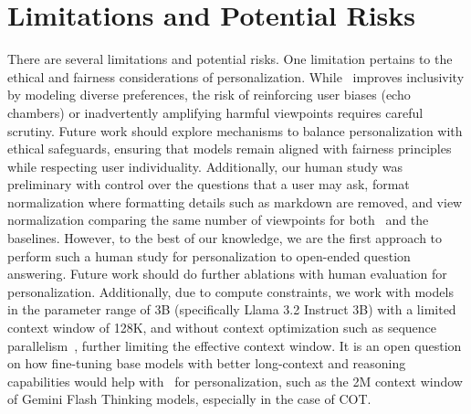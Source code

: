 \vspace{-0.15cm}
\section{Limitations and Potential Risks}
\vspace{-0.15cm}
There are several limitations and potential risks. One limitation pertains to the ethical and fairness considerations of personalization. While \methodname\ improves inclusivity by modeling diverse preferences, the risk of reinforcing user biases (echo chambers) or inadvertently amplifying harmful viewpoints requires careful scrutiny. Future work should explore mechanisms to balance personalization with ethical safeguards, ensuring that models remain aligned with fairness principles while respecting user individuality. Additionally, our human study was preliminary with control over the questions that a user may ask, format normalization where formatting details such as markdown are removed, and view normalization comparing the same number of viewpoints for both \methodname\ and the baselines. However, to the best of our knowledge, we are the first approach to perform such a human study for personalization to open-ended question answering. Future work should do further ablations with human evaluation for personalization. Additionally, due to compute constraints, we work with models in the parameter range of 3B (specifically Llama 3.2 Instruct 3B) with a limited context window of 128K, and without context optimization such as sequence parallelism~\citep{li2022sequenceparallelismlongsequence, yang2024contextparallelismscalablemilliontoken}, further limiting the effective context window. It is an open question on how fine-tuning base models with better long-context and reasoning capabilities would help with \methodname\ for personalization, such as the 2M context window of Gemini  Flash Thinking models, especially in the case of COT.